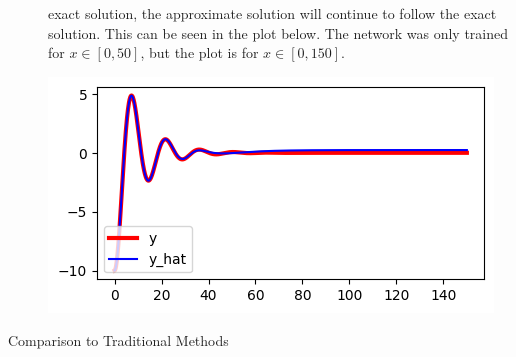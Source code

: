 \documentclass[12pt]{article}
\begin{document}
\begin{description}
    exact solution, the approximate solution will continue to follow the exact
    solution. This can be seen in the plot below. The network was only trained
    for $x\in[0, 50]$, but the plot is for $x\in[0, 150]$. \\
    \begin{minipage}{\linewidth}
        \centering
        \includegraphics[scale=.5]{images/figure17.png}
    \end{minipage}
    \item[Comparison to Traditional Methods] \hfill \\
\end{description}
\end{document}
